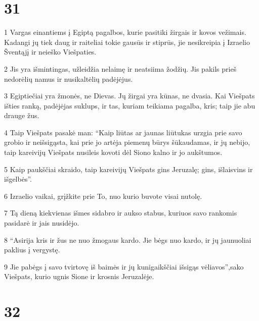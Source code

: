 \chapter{31}


\par 1 Vargas einantiems į Egiptą pagalbos, kurie pasitiki žirgais ir kovos vežimais. Kadangi jų tiek daug ir raiteliai tokie gausūs ir stiprūs, jie nesikreipia į Izraelio Šventąjį ir neieško Viešpaties. 
\par 2 Jis yra išmintingas, užleidžia nelaimę ir neatsiima žodžių. Jis pakils prieš nedorėlių namus ir nusikaltėlių padėjėjus. 
\par 3 Egiptiečiai yra žmonės, ne Dievas. Jų žirgai yra kūnas, ne dvasia. Kai Viešpats išties ranką, padėjėjas suklups, ir tas, kuriam teikiama pagalba, kris; taip jie abu drauge žus. 
\par 4 Taip Viešpats pasakė man: “Kaip liūtas ar jaunas liūtukas urzgia prie savo grobio ir neišsigąsta, kai prie jo artėja piemenų būrys šūkaudamas, ir jų nebijo, taip kareivijų Viešpats nusileis kovoti dėl Siono kalno ir jo aukštumos. 
\par 5 Kaip paukščiai skraido, taip kareivijų Viešpats gins Jeruzalę; gins, išlaisvins ir išgelbės”. 
\par 6 Izraelio vaikai, grįžkite prie To, nuo kurio buvote visai nutolę. 
\par 7 Tą dieną kiekvienas išmes sidabro ir aukso stabus, kuriuos savo rankomis pasidarė ir jais nusidėjo. 
\par 8 “Asirija kris ir žus ne nuo žmogaus kardo. Jie bėgs nuo kardo, ir jų jaunuoliai paklius į vergystę. 
\par 9 Jie pabėgs į savo tvirtovę iš baimės ir jų kunigaikščiai išsigąs vėliavos”,­sako Viešpats, kurio ugnis Sione ir krosnis Jeruzalėje.



\chapter{32}


